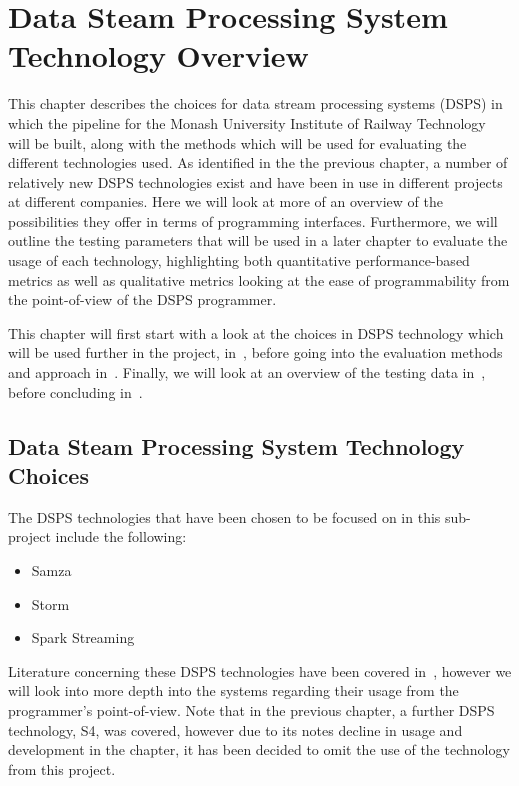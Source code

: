 \section{Data Steam Processing System Technology Overview}
\label{sec:overview}

This chapter describes the choices for data stream processing systems (DSPS) in which the pipeline for the Monash University
Institute of Railway Technology will be built, along with the methods which will be used for evaluating the different
technologies used. As identified in the the previous chapter, a number of relatively new DSPS technologies exist and have been in use
in different projects at different companies. Here we will look at more of an overview of the possibilities they offer
in terms of programming interfaces. Furthermore, we will outline the testing parameters that will be used in a later
chapter to evaluate the usage of each technology, highlighting both quantitative performance-based metrics as well as
qualitative metrics looking at the ease of programmability from the point-of-view of the DSPS programmer.

This chapter will first start with a look at the choices in DSPS technology which will be used further in the project,
in~, before going into the evaluation methods and approach in~.
Finally, we will look at an overview of the testing data in~, before concluding in~.


\subsection{Data Steam Processing System Technology Choices} %
\label{sub:dsps_technology_choices}

The DSPS technologies that have been chosen to be focused on in this sub-project include the following:

\begin{itemize}
  \item Samza
  \item Storm
  \item Spark Streaming
\end{itemize}

Literature concerning these DSPS technologies have been covered in~, however
we will look into more depth into the systems regarding their usage from the programmer's point-of-view. Note that
in the previous chapter, a further DSPS technology, S4, was covered, however due to its notes decline in usage and
development in the chapter, it has been decided to omit the use of the technology from this project.


